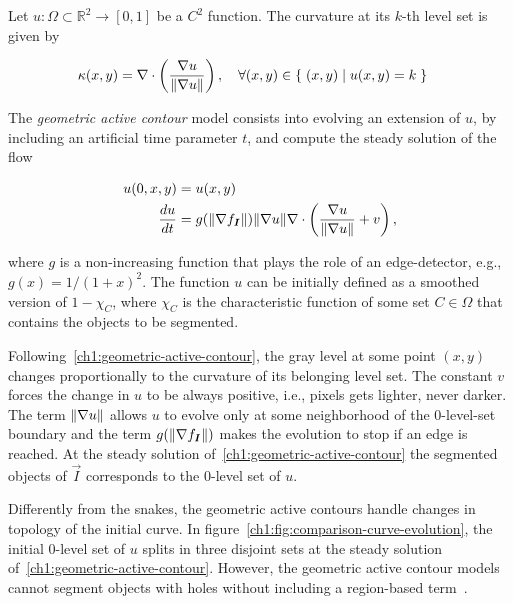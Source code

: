 Let $u:\Omega \subset \mathbb{R}^2 \rightarrow [0,1]$ be a $C^2$ function. The curvature at its $k$-th level set is given by

\begin{align*}
	\kappa (x,y) &= \nabla \cdot \left( \frac{\nabla u}{\lVert\nabla u\rVert} \right), \quad \forall (x,y) \in \left\{ \; (x,y) \; | \; u(x,y)=k \; \right\}
\end{align*}


The \emph{geometric active contour} model consists into evolving an extension of $u$, by including an artificial time parameter $t$, and compute the steady solution of the flow

\begin{align}
	u(0,x,y) &= u(x,y) \nonumber \\
	\frac{du}{dt} &= g( \lVert\nabla f_{\bm{I}}\rVert )\lVert\nabla u\rVert\nabla \cdot \left( \frac{\nabla u}{\lVert\nabla u\rVert}  + v \right),
	\label{ch1:geometric-active-contour}
\end{align}

where $g$ is a non-increasing function that plays the role of an edge-detector, e.g., $g(x) = 1/(1+x)^2$. The function $u$ can be initially defined as a smoothed version of $1 - \chi_C$, where $\chi_C$ is the characteristic function of some set $C \in \Omega $ that contains the objects to be segmented. 

Following~\cref{ch1:geometric-active-contour}, the gray level at some point $(x,y)$ changes proportionally to the curvature of its belonging level set. The constant $v$ forces the change in $u$ to be always positive, i.e., pixels gets lighter, never darker. The term $\lVert\nabla u\rVert$ allows $u$ to evolve only at some neighborhood of the $0$-level-set boundary and the term $g(\lVert\nabla f_{\bm{I}}\rVert)$ makes the evolution to stop if an edge is reached. At the steady solution of~\cref{ch1:geometric-active-contour} the segmented objects of $\vec{I}$ corresponds to the $0$-level set of $u$.

Differently from the snakes, the geometric active contours handle changes in topology of the initial curve. In figure~\cref{ch1:fig:comparison-curve-evolution}, the initial $0$-level set of $u$ splits in three disjoint sets at the steady solution of~\cref{ch1:geometric-active-contour}. However, the geometric active contour models cannot segment objects with holes without including a region-based term~\cite{chen06}.

